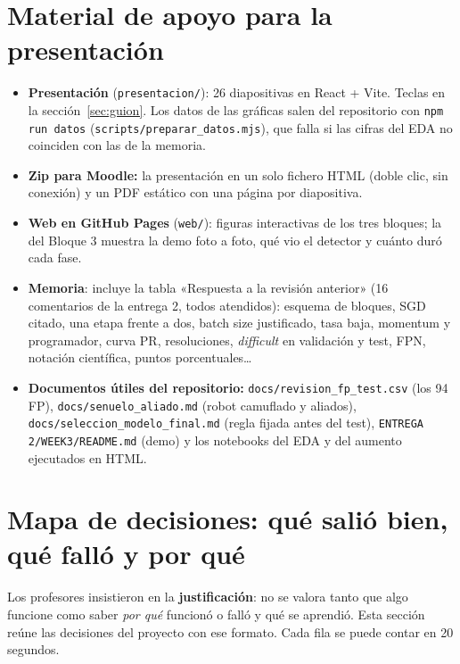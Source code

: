 \documentclass[11pt,a4paper]{article}
\newcommand{\cod}[1]{\texttt{#1}}
\begin{document}
\section{Material de apoyo para la presentación}
\begin{itemize}
  \item \textbf{Presentación} (\cod{presentacion/\allowbreak{}}): 26 diapositivas en React + Vite. Teclas en la sección~\ref{sec:guion}. Los datos de las gráficas salen del repositorio con \cod{npm run datos} (\cod{scripts/\allowbreak{}preparar\_\allowbreak{}datos.mjs}), que falla si las cifras del EDA no coinciden con las de la memoria.
  \item \textbf{Zip para Moodle:} la presentación en un solo fichero HTML (doble clic, sin conexión) y un PDF estático con una página por diapositiva.
  \item \textbf{Web en GitHub Pages} (\cod{web/\allowbreak{}}): figuras interactivas de los tres bloques; la del Bloque 3 muestra la demo foto a foto, qué vio el detector y cuánto duró cada fase.
  \item \textbf{Memoria}: incluye la tabla «Respuesta a la revisión anterior» (16 comentarios de la entrega 2, todos atendidos): esquema de bloques, SGD citado, una etapa frente a dos, batch size justificado, tasa baja, momentum y programador, curva PR, resoluciones, \emph{difficult} en validación y test, FPN, notación científica, puntos porcentuales\ldots
  \item \textbf{Documentos útiles del repositorio:} \cod{docs/\allowbreak{}revision\_\allowbreak{}fp\_\allowbreak{}test.csv} (los 94 FP), \cod{docs/\allowbreak{}senuelo\_\allowbreak{}aliado.md} (robot camuflado y aliados), \cod{docs/\allowbreak{}seleccion\_\allowbreak{}modelo\_\allowbreak{}final.md} (regla fijada antes del test), \cod{ENTREGA 2/\allowbreak{}WEEK3/\allowbreak{}README.md} (demo) y los notebooks del EDA y del aumento ejecutados en HTML.
\end{itemize}

\newpage
\section{Mapa de decisiones: qué salió bien, qué falló y por qué}\label{sec:mapa}

Los profesores insistieron en la \textbf{justificación}: no se valora tanto que algo funcione como saber \emph{por qué} funcionó o falló y qué se aprendió. Esta sección reúne las decisiones del proyecto con ese formato. Cada fila se puede contar en 20 segundos.
\end{document}
